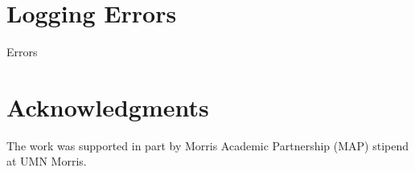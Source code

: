\documentclass[12pt]{article}
\begin{document}
\section{Logging Errors}
Errors

\section{Acknowledgments}
The work was supported in part by Morris Academic Partnership (MAP) stipend at UMN Morris.

%
%
\end{document}
